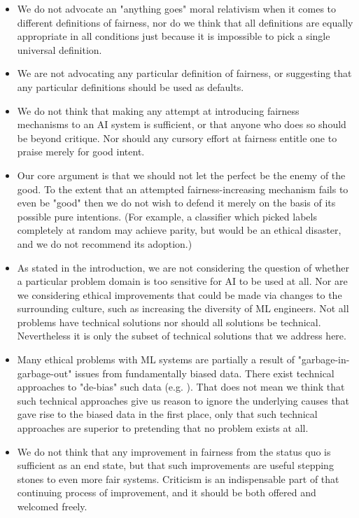 \documentclass[11pt]{article}
\newcommand{\textcite}[1]{\citet{#1}}
\begin{document}
\begin{itemize}
\item We do not advocate an "anything goes" moral relativism when it comes to different definitions of fairness, nor  do we think that all definitions are equally appropriate in all conditions just because it is impossible to pick a single universal definition.

\item We are not advocating any particular definition of fairness, or suggesting that any particular definitions should be used as defaults. 

\item We do not think that making any attempt at introducing fairness mechanisms to an AI system is sufficient, or that anyone who does so should be beyond critique. Nor should any cursory effort at fairness entitle one to praise merely for good intent.

\item Our core argument is that we should not let the perfect be the enemy of the good. To the extent that an attempted fairness-increasing mechanism fails to even be "good" then we do not wish to defend it merely on the basis of its possible pure intentions. (For example, a classifier which picked labels completely at random may achieve parity, but would be an ethical disaster, and we do not recommend its adoption.)

\item As stated in the introduction, we are not considering the question of whether a particular problem domain is too sensitive for AI to be used at all. Nor are we considering ethical improvements that could be made via changes to the surrounding culture, such as increasing the diversity of ML engineers. Not all problems have technical solutions nor should all solutions be technical. Nevertheless it is only the subset of technical solutions that we address here.

\item Many ethical problems with ML systems are partially a result of "garbage-in-garbage-out" issues from fundamentally biased data. There exist technical approaches to "de-bias" such data (e.g. \textcite{amini2019uncovering}). That does not mean we think that such technical approaches give us reason to ignore the underlying causes that gave rise to the biased data in the first place, only that such technical approaches are superior to pretending that no problem exists at all.

\item We do not think that any improvement in fairness from the status quo is sufficient as an end state, but that such improvements are useful stepping stones to even more fair systems. Criticism is an indispensable part of that continuing process of improvement, and it should be both offered and welcomed freely.


\end{itemize}
\end{document}
